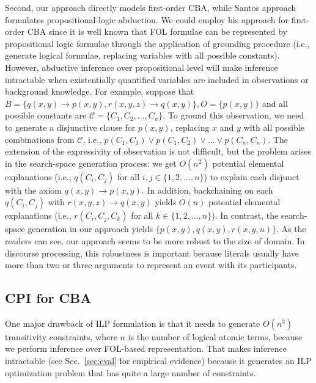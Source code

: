 \documentclass[english]{jnlp_1.4}
\begin{document}
Second, our approach directly models first-order CBA, while Santos approach
formulates propositional-logic abduction.
We could employ his approach for first-order CBA since it is
well known that FOL formulae can be represented by propositional logic
formulae through the application of grounding procedure (i.e., generate
logical formulae, replacing variables with all possible constants).
However, abductive inference over propositional level will make
inference intractable when existentially quantified variables are
included in observations or background knowledge. For example, suppose
that $B = \{q(x,y) \rightarrow p(x, y), r(x,y,z) \rightarrow q(x,y)
\}, O = \{p(x, y)\}$ and all possible constants are
$\mathcal{C}=\{C_1, C_2, \ldots, C_n\}$. To ground this observation, we
need to generate a disjunctive clause for $p(x,y)$, replacing $x$ and
$y$ with all possible combinations from $\mathcal{C}$,
i.e., $p(C_1,C_1) \lor p(C_1,C_2) \lor \ldots \lor p(C_n, C_n)$. The
extension of the expressivity of observation is not difficult, but the
problem arises in the search-space generation process: we get $O(n^2)$
potential elemental explanations (i.e., $q(C_i,C_j)$ for all $i,j \in
\{1,2,\ldots,n\}$) to explain each disjunct with the axiom $q(x,y)
\rightarrow p(x, y)$. In addition, backchaining on each $q(C_i,C_j)$
with $r(x,y,z) \rightarrow q(x,y)$ yields $O(n)$ potential elemental
explanations (i.e., $r(C_i,C_j,C_k)$ for all $k \in \{1,2,\ldots,n\}$). In
contrast, the search-space generation in our approach yields
$\{p(x,y),q(x,y),r(x,y,u)\}$. As the readers can see, our approach
seems to be more robust to the size of domain. In discourse
processing, this robustness is important because literals usually have
more than two or three arguments to represent an event with its
participants.


\subsection{CPI for CBA} \label{sec:cpi}








One major drawback of  ILP formulation is that it needs to generate
$O(n^3)$ transitivity constraints, where $n$ is the number of logical
atomic terms, because we perform inference over FOL-based
representation. That makes inference intractable (see
Sec.~\ref{sec:eval} for empirical evidence) because it generates an
ILP optimization problem that has quite a large number of
constraints. 
\end{document}
